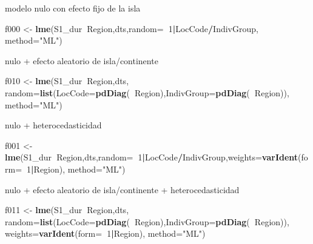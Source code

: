 \documentclass[]{article}
\newenvironment{Shaded}{\begin{snugshade}}{\end{snugshade}}
\newcommand{\DataTypeTok}[1]{\textcolor[rgb]{0.13,0.29,0.53}{#1}}
\newcommand{\DecValTok}[1]{\textcolor[rgb]{0.00,0.00,0.81}{#1}}
\newcommand{\KeywordTok}[1]{\textcolor[rgb]{0.13,0.29,0.53}{\textbf{#1}}}
\newcommand{\NormalTok}[1]{#1}
\newcommand{\OperatorTok}[1]{\textcolor[rgb]{0.81,0.36,0.00}{\textbf{#1}}}
\newcommand{\StringTok}[1]{\textcolor[rgb]{0.31,0.60,0.02}{#1}}
\begin{document}
modelo nulo con efecto fijo de la isla

\begin{Shaded}
\begin{Highlighting}[]
\NormalTok{f000 <-}\StringTok{ }\KeywordTok{lme}\NormalTok{(S1_dur}\OperatorTok{~}\NormalTok{Region,dts,}\DataTypeTok{random=}\OperatorTok{~}\DecValTok{1}\OperatorTok{|}\NormalTok{LocCode}\OperatorTok{/}\NormalTok{IndivGroup, }\DataTypeTok{method=}\StringTok{"ML"}\NormalTok{)}
\end{Highlighting}
\end{Shaded}

nulo + efecto aleatorio de isla/continente

\begin{Shaded}
\begin{Highlighting}[]
\NormalTok{f010 <-}\StringTok{ }\KeywordTok{lme}\NormalTok{(S1_dur}\OperatorTok{~}\NormalTok{Region,dts,}
  \DataTypeTok{random=}\KeywordTok{list}\NormalTok{(}\DataTypeTok{LocCode=}\KeywordTok{pdDiag}\NormalTok{(}\OperatorTok{~}\NormalTok{Region),}\DataTypeTok{IndivGroup=}\KeywordTok{pdDiag}\NormalTok{(}\OperatorTok{~}\NormalTok{Region)), }\DataTypeTok{method=}\StringTok{"ML"}\NormalTok{)}
\end{Highlighting}
\end{Shaded}

nulo + heterocedasticidad

\begin{Shaded}
\begin{Highlighting}[]
\NormalTok{f001 <-}\StringTok{ }\KeywordTok{lme}\NormalTok{(S1_dur}\OperatorTok{~}\NormalTok{Region,dts,}\DataTypeTok{random=}\OperatorTok{~}\DecValTok{1}\OperatorTok{|}\NormalTok{LocCode}\OperatorTok{/}\NormalTok{IndivGroup,}\DataTypeTok{weights=}\KeywordTok{varIdent}\NormalTok{(}\DataTypeTok{form=}\OperatorTok{~}\DecValTok{1}\OperatorTok{|}\NormalTok{Region), }\DataTypeTok{method=}\StringTok{"ML"}\NormalTok{)}
\end{Highlighting}
\end{Shaded}

nulo + efecto aleatorio de isla/continente + heterocedasticidad

\begin{Shaded}
\begin{Highlighting}[]
\NormalTok{f011 <-}
\StringTok{ }\KeywordTok{lme}\NormalTok{(S1_dur}\OperatorTok{~}\NormalTok{Region,dts,}
   \DataTypeTok{random=}\KeywordTok{list}\NormalTok{(}\DataTypeTok{LocCode=}\KeywordTok{pdDiag}\NormalTok{(}\OperatorTok{~}\NormalTok{Region),}\DataTypeTok{IndivGroup=}\KeywordTok{pdDiag}\NormalTok{(}\OperatorTok{~}\NormalTok{Region)),}
   \DataTypeTok{weights=}\KeywordTok{varIdent}\NormalTok{(}\DataTypeTok{form=}\OperatorTok{~}\DecValTok{1}\OperatorTok{|}\NormalTok{Region), }\DataTypeTok{method=}\StringTok{"ML"}\NormalTok{)}
\end{Highlighting}
\end{Shaded}
\end{document}
